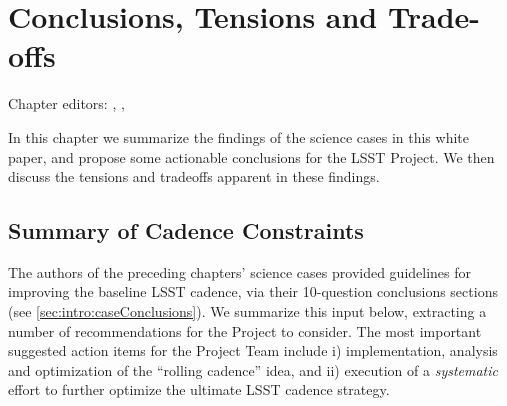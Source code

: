 \chapter[Conclusions, Tensions and Trade-offs]{Conclusions, Tensions and Trade-offs}
\def\chpname{tradeoffs}\label{chp:\chpname}

Chapter editors:
,
,


In this chapter we summarize the findings of the science cases in this
white paper, and propose some actionable conclusions for the LSST Project.
We then discuss the tensions and tradeoffs apparent in these findings.


\section{Summary of Cadence Constraints}


The authors of the preceding chapters' science cases provided guidelines
for improving the baseline LSST cadence, via their 10-question
conclusions sections (see \autoref{sec:intro:caseConclusions}).  We summarize this input below, extracting a number
of recommendations for the Project to consider. The most important suggested action
items for the Project Team include i) implementation, analysis and
optimization of the ``rolling cadence'' idea, and ii) execution of a
{\it systematic} effort to further optimize the ultimate LSST cadence
strategy.

